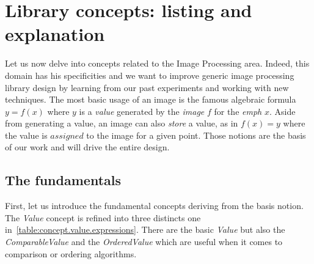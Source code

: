 \section{Library concepts: listing and explanation}
\label{sec:library.concepts}

Let us now delve into concepts related to the Image Processing area. Indeed, this domain has his specificities and we
want to improve generic image processing library design by learning from our past experiments and working with new
techniques. The most basic usage of an image is the famous algebraic formula $y = f(x)$ where $y$ is a \emph{value}
generated by the \emph{image} $f$ for the \emph{emph} $x$. Aside from generating a value, an image can also \emph{store}
a value, as in $f(x) = y$ where the value is $assigned$ to the image for a given point. Those notions are the basis of
our work and will drive the entire design.

\subsection{The fundamentals}

\label{subsec:fundamentals}

First, let us introduce the fundamental concepts deriving from the basis notion. The \emph{Value} concept is refined
into three distincts one in~\cref{table:concept.value.expressions}. There are the basic \emph{Value} but also the
\emph{ComparableValue} and the \emph{OrderedValue} which are useful when it comes to comparison or ordering algorithms.

